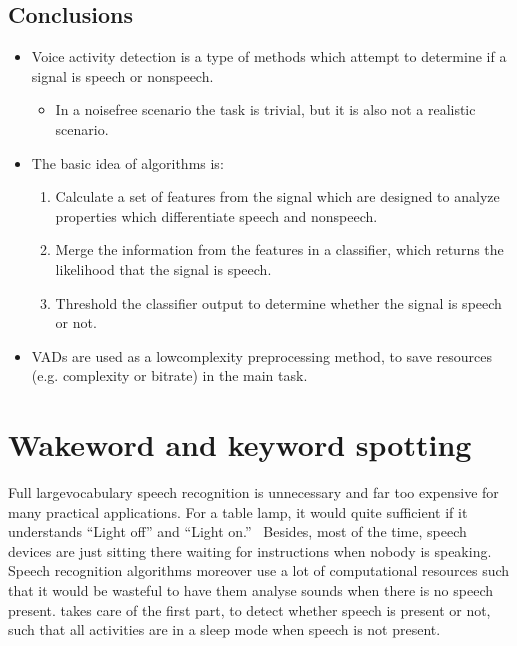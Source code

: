 \documentclass[letterpaper,10pt,english]{jupyterBook}
\begin{document}
\subsection{Conclusions}
\label{\detokenize{Recognition/Voice_activity_detection:conclusions}}\begin{itemize}
\item {} 
\sphinxAtStartPar
Voice activity detection is a type of methods which attempt to
determine if a signal is speech or non\sphinxhyphen{}speech.
\begin{itemize}
\item {} 
\sphinxAtStartPar
In a noise\sphinxhyphen{}free scenario the task is trivial, but it is also not
a realistic scenario.

\end{itemize}

\item {} 
\sphinxAtStartPar
The basic idea of algorithms is:
\begin{enumerate}
%
\item {} 
\sphinxAtStartPar
Calculate a set of features from the signal which are designed
to analyze properties which differentiate speech and non\sphinxhyphen{}speech.

\item {} 
\sphinxAtStartPar
Merge the information from the features in a classifier, which
returns the likelihood that the signal is speech.

\item {} 
\sphinxAtStartPar
Threshold the classifier output to determine whether the signal
is speech or not.

\end{enumerate}

\item {} 
\sphinxAtStartPar
VADs are used as a low\sphinxhyphen{}complexity pre\sphinxhyphen{}processing method, to save
resources (e.g. complexity or bitrate) in the main task.

\end{itemize}

\sphinxstepscope


\section{Wake\sphinxhyphen{}word and keyword spotting}
\label{\detokenize{Recognition/Wake-word_and_keyword_spotting:wake-word-and-keyword-spotting}}\label{\detokenize{Recognition/Wake-word_and_keyword_spotting::doc}}
\sphinxAtStartPar
Full large\sphinxhyphen{}vocabulary speech recognition is unnecessary and far too
expensive for many practical applications. For a table lamp, it would
quite sufficient if it understands “Light off” and “Light on.”  Besides,
most of the time, speech devices are just sitting there waiting for
instructions when nobody is speaking. Speech recognition algorithms
moreover use a lot of computational resources such that it would be
wasteful to have them analyse sounds when there is no speech present.
 takes
care of the first part, to detect whether speech is present or not, such
that all activities are in a sleep mode when speech is not present.
\end{document}

